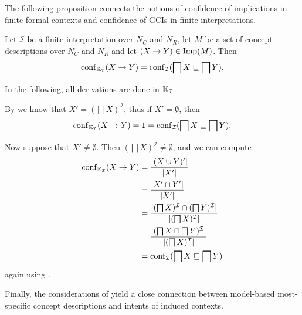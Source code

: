 The following proposition connects the notions of confidence of implications in finite
formal contexts and confidence of GCIs in finite interpretations.

\begin{Proposition}
  \label{prop:confidence-in-interpretation-is-the-same-as-in-induced-context}
  Let $\mathcal{I}$ be a finite interpretation over $N_C$ and $N_R$, let $M$ be a set of
  concept descriptions over $N_C$ and $N_R$ and let $(X \to Y) \in \operatorname{Imp}(M)$.  Then
  \begin{equation*}
    \operatorname{conf}_{{\mathbb{K}}_{\mathcal{I}}}( X \to Y ) = \operatorname{conf}_{\mathcal{I}}( \bigsqcap X \sqsubseteq
    \bigsqcap Y ).
  \end{equation*}
\end{Proposition}
\begin{Proof}
  In the following, all derivations are done in ${\mathbb{K}}_{\mathcal{I}}$.
  
  By  we know that $X' = (\bigsqcap X)^{\mathcal{I}}$,
  thus if $X' = \emptyset$, then
  \begin{equation*}
    \operatorname{conf}_{{\mathbb{K}}_{\mathcal{I}}}( X \to Y ) = 1 = \operatorname{conf}_{\mathcal{I}}( \bigsqcap X
    \sqsubseteq \bigsqcap Y ).
  \end{equation*}

  Now suppose that $X' \neq \emptyset$.  Then $(\bigsqcap X)^{\mathcal{I}} \neq
  \emptyset$, and we can compute
  \begin{align*}
    \operatorname{conf}_{{\mathbb{K}}_{\mathcal{I}}}( X \to Y )
    &= \frac{ \lvert (X \cup Y)' \rvert }{ \lvert X' \rvert } \\
    &= \frac{ \lvert X' \cap Y' \rvert }{ \lvert X' \rvert } \\
    &= \frac{ \lvert (\bigsqcap X)^{\mathcal{I}} \cap (\bigsqcap Y)^{\mathcal{I}} \rvert }{
      \lvert (\bigsqcap X)^{\mathcal{I}} \rvert } \\
    &= \frac{ \lvert (\bigsqcap X \sqcap \bigsqcap Y)^{\mathcal{I}} \rvert }{ \lvert (\bigsqcap
        X)^{\mathcal{I}} \rvert } \\
    &= \operatorname{conf}_{\mathcal{I}} (\bigsqcap X \sqsubseteq \bigsqcap Y)
  \end{align*}
  again using .
\end{Proof}

Finally, the considerations of  yield a close connection
between model-based most-specific concept descriptions and intents of induced contexts.

